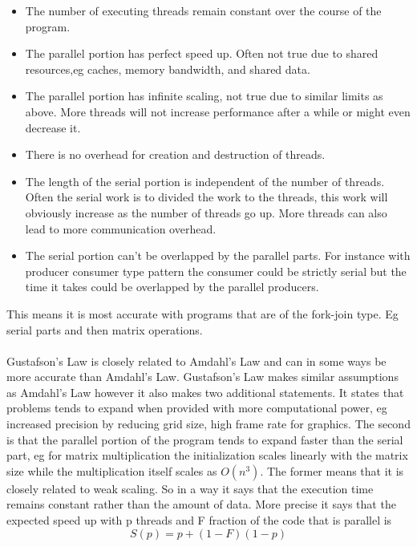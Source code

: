 \documentclass[10pt,a4paper]{report}
\begin{document}
\begin{itemize}
  \item The number of executing threads remain constant over the course of the program.
  \item The parallel portion has perfect speed up. Often not true due to shared resources,eg caches, memory bandwidth, and shared data.
  \item The parallel portion has infinite scaling, not true due to similar limits as above. More threads will not increase performance after a while or might even decrease it.
  \item There is no overhead for creation and destruction of threads.
  \item The length of the serial portion is independent of the number of threads. Often the serial work is to divided the work to the threads, this work will obviously increase as the number of threads go up. More threads can also lead to more communication overhead.
  \item The serial portion can't be overlapped by the parallel parts. For instance with producer consumer type pattern the consumer could be strictly serial but the time it takes could be overlapped by the parallel producers.
\end{itemize}

This means it is most accurate with programs that are of the fork-join type. Eg serial parts and then matrix operations.\\
\\
Gustafson's Law is closely related to Amdahl's Law and can in some ways be more accurate than Amdahl's Law. Gustafson's Law makes similar assumptions as Amdahl's Law however it also makes two additional statements. It states that problems tends to expand when provided with more computational power, eg increased precision by reducing grid size, high frame rate for graphics. The second is that the parallel portion of the program tends to expand faster than the serial part, eg for matrix multiplication the initialization scales linearly with the matrix size while the multiplication itself scales as $O(n^3)$. The former means that it is closely related to weak scaling. So in a way it says that the execution time remains constant rather than the amount of data. More precise it says that the expected speed up with p threads and F fraction of the code that is parallel is\cite{gustafson1988reevaluating, cuda_best_practice}
$$S(p)=p+(1-F)(1-p)$$
\end{document}
